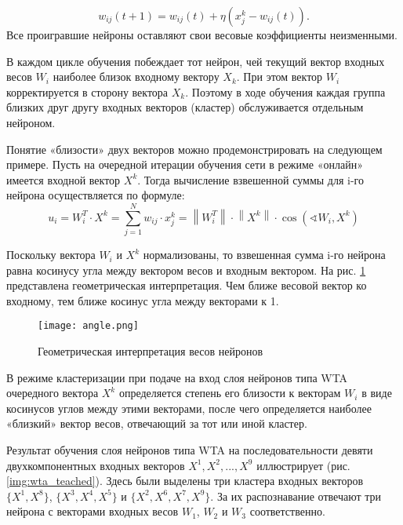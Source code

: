 \begin{equation}\label{eq:Func}
    w_{ij}(t+1)=w_{ij}(t)+\eta(x_j^k-w_{ij}(t)).
\end{equation}
Все проигравшие нейроны оставляют свои весовые коэффициенты неизменными. 

В каждом цикле обучения побеждает тот нейрон, чей текущий вектор входных весов $W_i$ наиболее близок входному вектору $X_k$. При этом вектор $W_i$ корректируется в сторону вектора $X_k$. Поэтому в ходе обучения каждая группа близких друг другу входных векторов (кластер) обслуживается отдельным нейроном.




Понятие «близости» двух векторов можно продемонстрировать на следующем примере. Пусть на очередной итерации обучения сети в режиме «онлайн» имеется входной вектор $X^k$. Тогда вычисление взвешенной суммы для i-го нейрона осуществляется по формуле:
\begin{equation}\label{eq:sum_func}
    u _ { i } = W _ { i } ^ { T } \cdot X ^ { k } = \sum _ { j = 1 } ^ { N } w _ { i j } \cdot x _ { j } ^ { k } = \left\| W _ { i } ^ { T } \right\| \cdot \left\| X ^ { k } \right\| \cdot \cos \left( \sphericalangle   W _ { i } , X ^ { k } \right)
\end{equation}

Поскольку вектора $W_i$ и $X^k$ нормализованы, то взвешенная сумма i-го нейрона равна косинусу угла между вектором весов и входным вектором. На рис. \ref{img:angle} представлена геометрическая интерпретация. Чем ближе весовой вектор ко входному, тем ближе косинус угла между векторами к 1.

\begin{figure}[H]
\centering
\texttt{[image: angle.png]}
\caption{Геометрическая интерпретация весов нейронов}
\label{img:angle}
\end{figure}

В режиме кластеризации при подаче на вход слоя нейронов типа WTA очередного вектора $X^k$ определяется степень его близости к векторам $W_i$ в виде косинусов углов между этими векторами, после чего определяется наиболее «близкий» вектор весов, отвечающий за тот или иной кластер.

Результат обучения слоя нейронов типа WTA на последовательности девяти двухкомпонентных входных векторов ${X^1, X^2, ..., X^9}$ иллюстрирует (рис. \ref{img:wta_teached}). Здесь были выделены три кластера входных векторов $\{X^1, X^8\}$, $\{X^3, X^4, X^5\}$ и $\{X^2, X^6, X^7, X^9\}$. За их распознавание отвечают три нейрона с векторами входных весов $W_1$, $W_2$ и $W_3$ соответственно.

